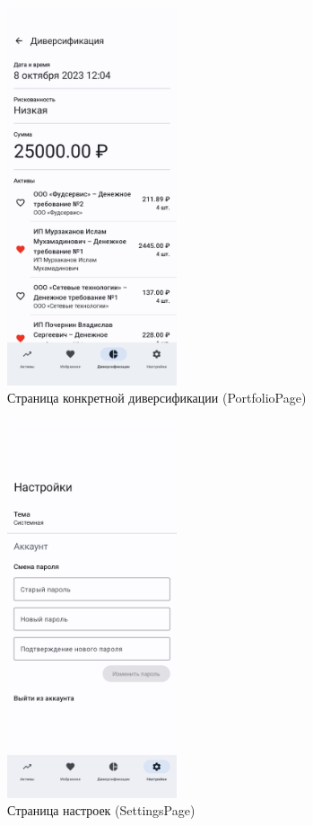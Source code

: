 \documentclass[a4paper, 14pt]{article}
\begin{document}
\begin{figure}[H]
    \centering
    \includegraphics[width=5cm]{resources/12.png}
    \caption{Страница конкретной диверсификации (PortfolioPage)}
\end{figure}

\begin{figure}[H]
    \centering
    \includegraphics[width=5cm]{resources/13.png}
    \caption{Страница настроек (SettingsPage)}
\end{figure}
\end{document}
